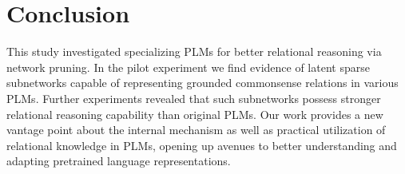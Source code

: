 \section{Conclusion}
This study investigated specializing PLMs for better relational reasoning via network pruning. In the pilot experiment we find evidence of latent sparse subnetworks 
capable of representing grounded commonsense relations in various PLMs. Further experiments revealed 
that such subnetworks possess stronger relational reasoning capability than original PLMs. 
Our work provides a new vantage point about the internal mechanism as well as practical utilization of 
relational knowledge in PLMs, opening up avenues to better understanding and adapting pretrained language 
representations.
%
%




